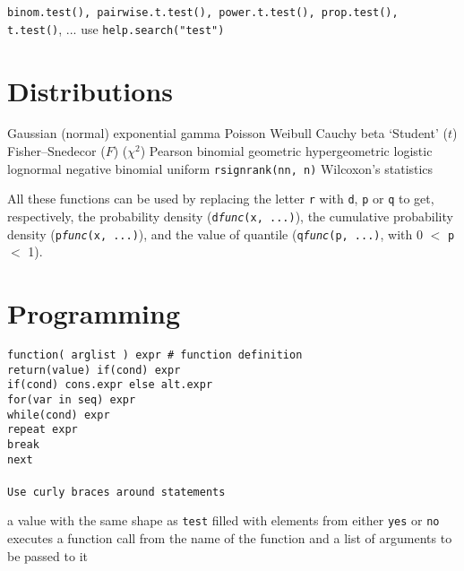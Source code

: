 {\tt binom.test(), pairwise.t.test(), power.t.test(), prop.test(), t.test()}, ... use {\tt help.search("test")}

\section{Distributions}{}

	{Gaussian (normal)}
	{exponential}
	{gamma}
	{Poisson}
	{Weibull}
	{Cauchy}
	{beta}
	{`Student' ($t$)}
	{Fisher--Snedecor ($F$)  ($\chi^2$)}
	{Pearson}
	{binomial}
	{geometric}
	{hypergeometric}
	{logistic}
	{lognormal}
	{negative binomial}
	{uniform}
	{{\tt rsignrank(nn, n)} Wilcoxon's statistics}

All these functions can be used by replacing the letter {\tt r} with
{\tt d}, {\tt p} or {\tt q} to get, respectively, the probability
density ({\tt d{\it func}(x, ...)}), the cumulative probability
density ({\tt p{\it func}(x, ...)}), and the value of quantile
({\tt q{\it func}(p, ...)}, with 0 $<$ {\tt p} $<$ 1).

\section{Programming}{}

{\tt function( arglist ) expr \# function definition\\ return(value) if(cond)
    expr\\ if(cond) cons.expr else  alt.expr\\ for(var in seq) expr\\
    while(cond) expr\\ repeat expr\\ break\\ next\\\\ Use curly braces around
    statements}


	{a value with the same shape as {\tt test} filled with elements from either {\tt yes} or {\tt no}}
	{executes a function call from the name of the function and a list of arguments to be passed to it}

